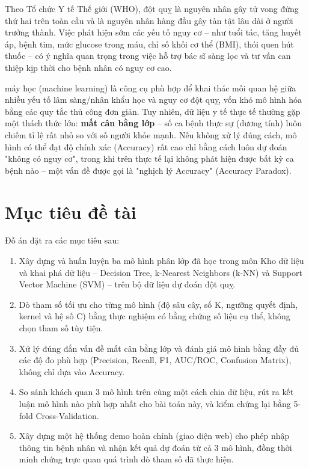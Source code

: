 \documentclass[12pt,a4paper]{report}
\begin{document}
Theo Tổ chức Y tế Thế giới (WHO), đột quỵ là nguyên nhân gây tử vong đứng thứ hai trên toàn cầu và là nguyên nhân hàng đầu gây tàn tật lâu dài ở người trưởng thành. Việc phát hiện sớm các yếu tố nguy cơ -- như tuổi tác, tăng huyết áp, bệnh tim, mức glucose trong máu, chỉ số khối cơ thể (BMI), thói quen hút thuốc -- có ý nghĩa quan trọng trong việc hỗ trợ bác sĩ sàng lọc và tư vấn can thiệp kịp thời cho bệnh nhân có nguy cơ cao.

máy học (machine learning) là công cụ phù hợp để khai thác mối quan hệ giữa nhiều yếu tố lâm sàng/nhân khẩu học và nguy cơ đột quỵ, vốn khó mô hình hóa bằng các quy tắc thủ công đơn giản. Tuy nhiên, dữ liệu y tế thực tế thường gặp một thách thức lớn: \textbf{mất cân bằng lớp} -- số ca bệnh thực sự (dương tính) luôn chiếm tỉ lệ rất nhỏ so với số người khỏe mạnh. Nếu không xử lý đúng cách, mô hình có thể đạt độ chính xác (Accuracy) rất cao chỉ bằng cách luôn dự đoán "không có nguy cơ", trong khi trên thực tế lại không phát hiện được bất kỳ ca bệnh nào -- một vấn đề được gọi là "nghịch lý Accuracy" (Accuracy Paradox).

\section{Mục tiêu đề tài}

Đồ án đặt ra các mục tiêu sau:

\begin{enumerate}
    \item Xây dựng và huấn luyện ba mô hình phân lớp đã học trong môn Kho dữ liệu và khai phá dữ liệu -- Decision Tree, k-Nearest Neighbors (k-NN) và Support Vector Machine (SVM) -- trên bộ dữ liệu dự đoán đột quỵ.
    \item Dò tham số tối ưu cho từng mô hình (độ sâu cây, số K, ngưỡng quyết định, kernel và hệ số C) bằng thực nghiệm có bằng chứng số liệu cụ thể, không chọn tham số tùy tiện.
    \item Xử lý đúng đắn vấn đề mất cân bằng lớp và đánh giá mô hình bằng đầy đủ các độ đo phù hợp (Precision, Recall, F1, AUC/ROC, Confusion Matrix), không chỉ dựa vào Accuracy.
    \item So sánh khách quan 3 mô hình trên cùng một cách chia dữ liệu, rút ra kết luận mô hình nào phù hợp nhất cho bài toán này, và kiểm chứng lại bằng 5-fold Cross-Validation.
    \item Xây dựng một hệ thống demo hoàn chỉnh (giao diện web) cho phép nhập thông tin bệnh nhân và nhận kết quả dự đoán từ cả 3 mô hình, đồng thời minh chứng trực quan quá trình dò tham số đã thực hiện.
\end{enumerate}
\end{document}
